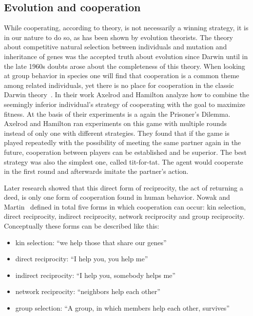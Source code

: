 \subsection{Evolution and cooperation}
\label{sec:evolution}
While cooperating, according to theory, is not necessarily a winning strategy, it is in our nature 
to do so, as has been shown by evolution theorists. The theory about competitive natural selection 
between individuals and mutation and inheritance of genes was the accepted truth about evolution 
since Darwin until in the late 1960s doubts arose about the completeness of this 
theory. When looking at group behavior in species one will find that cooperation is a common theme
among related individuals, yet there is no place for cooperation in the classic Darwin 
theory~\cite{Axelrod1390}. In their work Axelrod and Hamilton \cite{Axelrod1390} 
analyze how to combine the seemingly inferior individual's strategy of cooperating with the goal to 
maximize fitness. At the basis of their experiments is a again the Prisoner's 
Dilemma. Axelrod and Hamilton ran experiments on this game with multiple rounds instead of only one with
different strategies. They found that if the game is played repeatedly with the possibility of 
meeting the same partner again in the future, cooperation between players can be established and be
superior. The best strategy was also the simplest one, called tit-for-tat. The agent would cooperate
in the first round and afterwards imitate the partner's action.

Later research showed that this direct form of reciprocity, the act of returning a deed,
is only one form of cooperation found in human behavior. Nowak and 
Martin~\cite{nowak2006five} defined in total five forms in which cooperation can occur: kin selection, direct
reciprocity, indirect reciprocity, network reciprocity and group reciprocity. Conceptually these 
forms can be described like this:

\begin{itemize}
    \item kin selection: ``we help those that share our genes''
    \item direct reciprocity: ``I help you, you help me''
    \item indirect reciprocity: ``I help you, somebody helps me''
    \item network reciprocity: ``neighbors help each other''
    \item group selection: ``A group, in which members help each other, survives''
\end{itemize}

